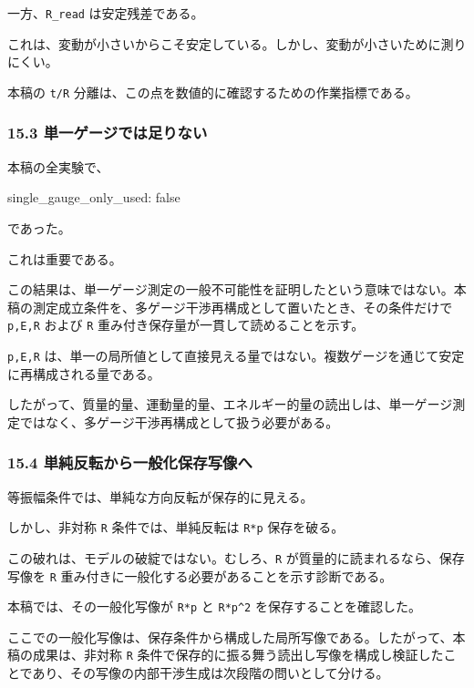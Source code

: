 \documentclass[
  a4paper,
]{article}
\newenvironment{Shaded}{}{}
\newcommand{\NormalTok}[1]{#1}
\begin{document}
一方、\texttt{R\_read} は安定残差である。

これは、変動が小さいからこそ安定している。しかし、変動が小さいために測りにくい。

本稿の \texttt{t/R}
分離は、この点を数値的に確認するための作業指標である。

\subsubsection{15.3
単一ゲージでは足りない}\label{ux5358ux4e00ux30b2ux30fcux30b8ux3067ux306fux8db3ux308aux306aux3044}

本稿の全実験で、

\begin{Shaded}
\begin{Highlighting}[]
\NormalTok{single\_gauge\_only\_used: false}
\end{Highlighting}
\end{Shaded}

であった。

これは重要である。

この結果は、単一ゲージ測定の一般不可能性を証明したという意味ではない。本稿の測定成立条件を、多ゲージ干渉再構成として置いたとき、その条件だけで
\texttt{p,E,R} および \texttt{R}
重み付き保存量が一貫して読めることを示す。

\texttt{p,E,R}
は、単一の局所値として直接見える量ではない。複数ゲージを通じて安定に再構成される量である。

したがって、質量的量、運動量的量、エネルギー的量の読出しは、単一ゲージ測定ではなく、多ゲージ干渉再構成として扱う必要がある。

\subsubsection{15.4
単純反転から一般化保存写像へ}\label{ux5358ux7d14ux53cdux8ee2ux304bux3089ux4e00ux822cux5316ux4fddux5b58ux5199ux50cfux3078}

等振幅条件では、単純な方向反転が保存的に見える。

しかし、非対称 \texttt{R} 条件では、単純反転は \texttt{R*p} 保存を破る。

この破れは、モデルの破綻ではない。むしろ、\texttt{R}
が質量的に読まれるなら、保存写像を \texttt{R}
重み付きに一般化する必要があることを示す診断である。

本稿では、その一般化写像が \texttt{R*p} と \texttt{R*p\^{}2}
を保存することを確認した。

ここでの一般化写像は、保存条件から構成した局所写像である。したがって、本稿の成果は、非対称
\texttt{R}
条件で保存的に振る舞う読出し写像を構成し検証したことであり、その写像の内部干渉生成は次段階の問いとして分ける。
\end{document}
